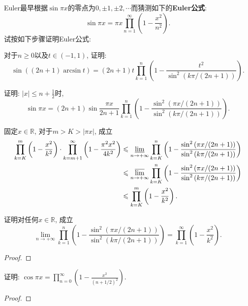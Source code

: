 \begin{quizb}
\woe Euler最早根据\(\sin \pi x\)的零点为\(0,\pm 1,\pm 2,\cdots\)而猜测如下的\textbf{Euler公式}: \[\sin \pi x=\pi x\prod_{n=1}^{\infty}\left(1-\frac{x^2}{n^2}\right).\]试按如下步骤证明Euler公式:
\begin{quizs}
\item 对于\(n\geqslant 0\)以及\(t\in (-1,1)\), 证明:\[\sin\left((2n+1)\arcsin t\right)=(2n+1)t\prod_{k=1}^{n}\left(1-\frac{t^2}{\sin^2\left(k\pi/(2n+1)\right)}\right).\]
\item 证明: \(|x|\leqslant n+\frac{1}{2}\)时,\[\sin \pi x=(2n+1)\sin\frac{\pi x}{2n+1}\prod_{k=1}^{n}\left(1-\frac{\sin^2\left(\pi x/(2n+1)\right)}{\sin^2\left(k\pi/(2n+1)\right)}\right).\]
\item 固定\(x\in\mathbb{R}\), 对于\(m>K>|\pi x|\), 成立
\[\begin{split}
\prod_{k=K}^{m}\left(1-\frac{x^2}{k^2}\right)\cdot\prod_{k=m+1}^{\infty}\left(1-\frac{\pi^2x^2}{4k^2}\right)&\leqslant\varliminf_{n\rightarrow+\infty}\prod_{k=K}^{n}\left(1-\frac{\sin^2\left(\pi x/(2n+1)\right)}{\sin^2\left(k\pi/(2n+1)\right)}\right)\\&\leqslant\varlimsup_{n\rightarrow+\infty}\prod_{k=K}^{n}\left(1-\frac{\sin^2\left(\pi x/(2n+1)\right)}{\sin^2\left(k\pi/(2n+1)\right)}\right)\\&\leqslant\prod_{k=K}^{m}\left(1-\frac{x^2}{k^2}\right). \end{split}\]
\item 证明对任何\(x\in\mathbb{R}\), 成立\[\lim_{n\rightarrow+\infty}\prod_{k=1}^{n}\left(1-\frac{\sin^2\left(\pi x/(2n+1)\right)}{\sin^2\left(k\pi/(2n+1)\right)}\right)=\prod_{k=1}^{\infty}\left(1-\frac{x^2}{k^2}\right).\]
\end{quizs}
\begin{proof}

\end{proof}
\woe 证明: \(\cos \pi x=\prod_{n=0}^{\infty}\left(1-\frac{x^2}{\left(n+1/2\right)^2}\right)\).
\begin{proof}

\end{proof}
\end{quizb}